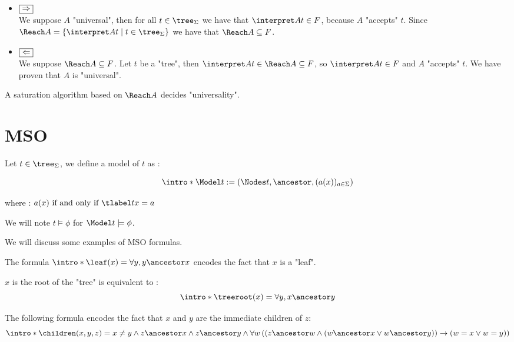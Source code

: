 \documentclass[twoside]{article}
\begin{document}
\begin{proofI}
	\begin{itemize}
		\item $\fbox{$\Rightarrow$}$\\
		      We suppose $A$ "universal", then for all $t \in \tree_\Sigma$ we have that $\interpret A t \in F$, because $A$ "accepts" $t$.
		      Since $\Reach A = \setdef {\interpret A t} {t\in \tree_\Sigma}$ we have that $\Reach A \subseteq F$.

		\item $\fbox{$\Leftarrow$}$\\
		      We suppose $\Reach A \subseteq F$. Let $t$ be a "tree", then $\interpret A t \in \Reach A \subseteq F$, so $\interpret A t \in F$ and $A$
		      "accepts" $t$. We have proven that $A$ is "universal".
	\end{itemize}
\end{proofI}


\begin{coro}\label{coro:univeral-Reach}
	A saturation algorithm based on $\Reach A$ decides "universality".
\end{coro}


\section{MSO}\label{sec:MSO}

\begin{definition}
	Let $t \in \tree_{\Sigma}$, we define a model of $t$ as :

	\[\intro* \Model t := (\Nodes t, \ancestor , (a (x))_{a \in \Sigma}) \]

	where : $a(x) \tiff \tlabel t x = a$

	We will note $t \models \phi$ for $\Model t \models \phi$. 
\end{definition}


We will discuss some examples of MSO formulas.

\begin{example}
	The formula $\intro* \leaf (x) = \forall y,  y \ancestor x$ encodes the fact that $x$ is a "leaf".
\end{example}

\begin{example}
	$x$ is the root of the "tree" is equivalent to :
	\[\intro* \treeroot (x) = \forall y,  x \ancestor y \]
\end{example}

\begin{example}
	The following formula encodes the fact that $x$ and $y$ are the immediate children of $z$:
	\[\intro* \children (x,y,z) =
		x \neq y \land
		z  \ancestor  x \land  z \ancestor y \land
		\forall w
		\left( \left(
			z \ancestor w \land
				(w \ancestor x \lor w \ancestor  y) \right) \rightarrow (
			w = x \lor w = y
			)
		\right) \]
\end{example}
\end{document}

